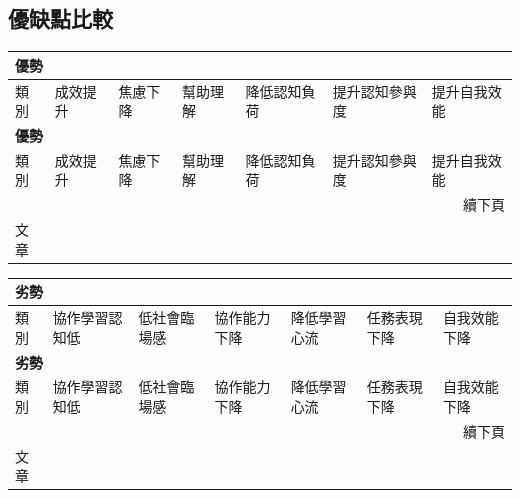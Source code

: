 \subsection{優缺點比較}\label{sec:優缺點比較}

\begingroup
\small
\setlength{\tabcolsep}{2pt}
\begin{longtable}{@{}p{} p{} p{} p{} p{} p{} p{}@{}}
\toprule
\multicolumn{7}{l}{\textbf{優勢}} \\
\midrule
類別 & 成效提升 & 焦慮下降 & 幫助理解 & 降低認知負荷 & 提升認知參與度 & 提升自我效能 \\
\midrule
\endfirsthead
\toprule
\multicolumn{7}{l}{\textbf{優勢}} \\
\midrule
類別 & 成效提升 & 焦慮下降 & 幫助理解 & 降低認知負荷 & 提升認知參與度 & 提升自我效能 \\
\midrule
\endhead
\midrule
\multicolumn{7}{r}{續下頁} \\
\endfoot
\bottomrule
\endlastfoot
文章 & \cite{fan2025pair,groothuijsen2024chatbots,llerena2024introductory,omeh2025pbl,kohen2025integrating,tang2025enhancing} & \cite{fan2025pair} & \cite{cao2023chatbots,groothuijsen2024chatbots,llerena2024introductory,tang2025enhancing} & \cite{yan2025llm} & \cite{cao2023chatbots,kohen2025integrating} & \cite{yan2025llm,tang2025enhancing,cubillos2025generative} \\
\end{longtable}
\endgroup

\begingroup
\small
\setlength{\tabcolsep}{2pt}
\begin{longtable}{@{}p{} p{} p{} p{} p{} p{} p{}@{}}
\toprule
\multicolumn{7}{l}{\textbf{劣勢}} \\
\midrule
類別 & 協作學習認知低 & 低社會臨場感 & 協作能力下降 & 降低學習心流 & 任務表現下降 & 自我效能下降 \\
\midrule
\endfirsthead
\toprule
\multicolumn{7}{l}{\textbf{劣勢}} \\
\midrule
類別 & 協作學習認知低 & 低社會臨場感 & 協作能力下降 & 降低學習心流 & 任務表現下降 & 自我效能下降 \\
\midrule
\endhead
\midrule
\multicolumn{7}{r}{續下頁} \\
\endfoot
\bottomrule
\endlastfoot
文章 & \cite{fan2025pair,groothuijsen2024chatbots} & \cite{fan2025pair} & \cite{groothuijsen2024chatbots} & \cite{yang2025chatgpt} & \cite{kohen2025integrating} & \cite{yang2025chatgpt} \\
\end{longtable}
\endgroup

